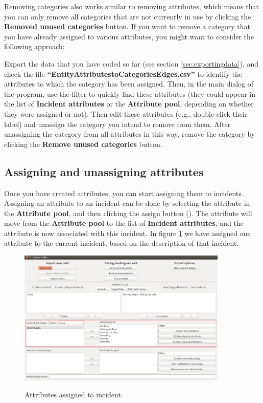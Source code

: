 \documentclass{memoir}
\begin{document}
Removing categories also works similar to removing attributes, which means that you can only remove all categories that are not currently in use by clicking the \textbf{Removed unused categories} button. If you want to remove a category that you have already assigned to various attributes, you might want to consider the following approach:

Export the data that you have coded so far (see section \ref{sec:exportingdata}), and check the file \textbf{``Entity\textunderscore Attributes\textunderscore to\textunderscore Categories\textunderscore Edges.csv''} to identify the attributes to which the category has been assigned. Then, in the main dialog of the program, use the filter to quickly find these attributes (they could appear in the list of \textbf{Incident attributes} or the \textbf{Attribute pool}, depending on whether they were assigned or not). Then edit these attributes (e.g., double click their label) and unassign the category you intend to remove from them. After unassigning the category from all attributes in this way, remove the category by clicking the \textbf{Remove unused categories} button.

\subsection{Assigning and unassigning attributes}
\label{sec:assigningunassigningattributes}

Once you have created attributes, you can start assigning them to incidents. Assigning an attribute to an incident can be done by selecting the attribute in the \textbf{Attribute pool}, and then clicking the assign button (\textbf{\guillemotleft}). The attribute will move from the \textbf{Attribute pool} to the list of \textbf{Incident attributes}, and the attribute is now associated with this incident. In figure \ref{fig:assignedattributes} we have assigned one attribute to the current incident, based on the description of that incident.

\begin{figure}[h!]
  \centering
  \caption{Attributes assigned to incident.}
  \includegraphics[width=100mm]{Screenshot_13.pdf}
  \label{fig:assignedattributes}
\end{figure}
\end{document}
